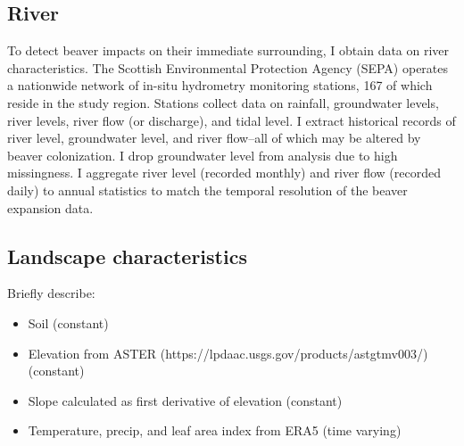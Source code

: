 \subsection{River}
To detect beaver impacts on their immediate surrounding, I obtain data on river characteristics. The Scottish Environmental Protection Agency (SEPA) operates a nationwide network of in-situ hydrometry monitoring stations, 167 of which reside in the study region. Stations collect data on rainfall, groundwater levels, river levels, river flow (or discharge), and tidal level. I extract historical records of river level, groundwater level, and river flow--all of which may be altered by beaver colonization. I drop groundwater level from analysis due to high missingness. I aggregate river level (recorded monthly) and river flow (recorded daily) to annual statistics to match the temporal resolution of the beaver expansion data.

\subsection{Landscape characteristics}

Briefly describe: 

\begin{itemize}
    \item Soil (constant)
    \item Elevation from ASTER (https://lpdaac.usgs.gov/products/astgtmv003/)  (constant)
    \item Slope calculated as first derivative of elevation (constant)
    \item Temperature, precip, and leaf area index from ERA5 (time varying)
\end{itemize}

